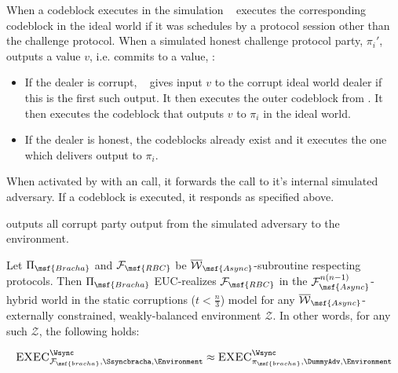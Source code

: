 When a codeblock executes in the simulation \Ssyncbracha~ executes the corresponding codeblock in the ideal world if it was schedules by a protocol session other than the challenge protocol.
When a simulated honest challenge protocol party, $\pi_i'$, outputs a value $v$, i.e. commits to a value, \Ssyncbracha:
\begin{itemize}
\item If the dealer is corrupt, \Ssyncbracha~ gives input $v$ to the corrupt ideal world dealer if this is the first such output. It then executes the outer codeblock from \Fbracha. It then executes the codeblock that outputs $v$ to $\pi_i$ in the ideal world.
\item If the dealer is honest, the codeblocks already exist and it executes the one which delivers output to $\pi_i$.
\end{itemize}

When activated by \Environment with an \Exec call, it forwards the call to it's internal simulated adversary. If a codeblock is executed, it responds as specified above. 

\Ssyncbracha outputs all corrupt party output from the simulated adversary to the environment.


\begin{theorem}\label{thm:async_bracha}

Let $\Pi_{\msf{Bracha}}$ and $\mathcal{F}_{\msf{RBC}}$ be $\overline{\mathcal{W}}_{\msf{Async}}$-subroutine respecting protocols. 
Then $\Pi_{\msf{Bracha}}$ EUC-realizes $\mathcal{F}_{\msf{RBC}}$ in the $\mathcal{F}^{n(n-1)}_{\msf{Async}}$-hybrid world in the static corruptions ($t < \frac{n}{3}$) model for any $\overline{\mathcal{W}}_{\msf{Async}}$-externally constrained, weakly-balanced environment $\mathcal{Z}$. In other words, for any such $\mathcal{Z}$, the following holds:

$$\textsc{EXEC}^{\Wsync}_{\mathcal{F}_{\msf{bracha}}, \Ssyncbracha, \Environment} \approx \textsc{EXEC}^{\Wsync}_{\pi_{\msf{bracha}}, \DummyAdv, \Environment}$$
\end{theorem}


